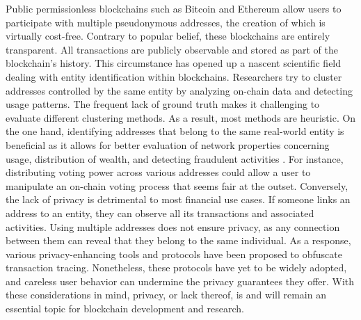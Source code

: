 \documentclass[12pt,a4paper,titlepage,oneside,english]{article}
\begin{document}
Public permissionless blockchains such as Bitcoin \citep{nakamotoBitcoin2008} and Ethereum \citep{buterin2014ethereum} allow users to participate with multiple pseudonymous addresses, the creation of which is virtually cost-free. Contrary to popular belief, these blockchains are entirely transparent. All transactions are publicly observable and stored as part of the blockchain's history.
This circumstance has opened up a nascent scientific field dealing with entity identification within blockchains. Researchers try to cluster addresses controlled by the same entity by analyzing on-chain data and detecting usage patterns. The frequent lack of ground truth makes it challenging to evaluate different clustering methods. As a result, most methods are heuristic. \newline
On the one hand, identifying addresses that belong to the same real-world entity is beneficial as it allows for better evaluation of network properties concerning usage, distribution of wealth, and detecting fraudulent activities \citep{FV:17}. For instance, distributing voting power across various addresses could allow a user to manipulate an on-chain voting process that seems fair at the outset. \newline
Conversely, the lack of privacy is detrimental to most financial use cases. If someone links an address to an entity, they can observe all its transactions and associated activities. Using multiple addresses does not ensure privacy, as any connection between them can reveal that they belong to the same individual. \citep{nadler2023tornado} \newline
As a response, various privacy-enhancing tools and protocols have been proposed to obfuscate transaction tracing. 
Nonetheless, these protocols have yet to be widely adopted, and careless user behavior can undermine the privacy guarantees they offer. \newline
With these considerations in mind, privacy, or lack thereof, is and will remain an essential topic for blockchain development and research. %
\end{document}
